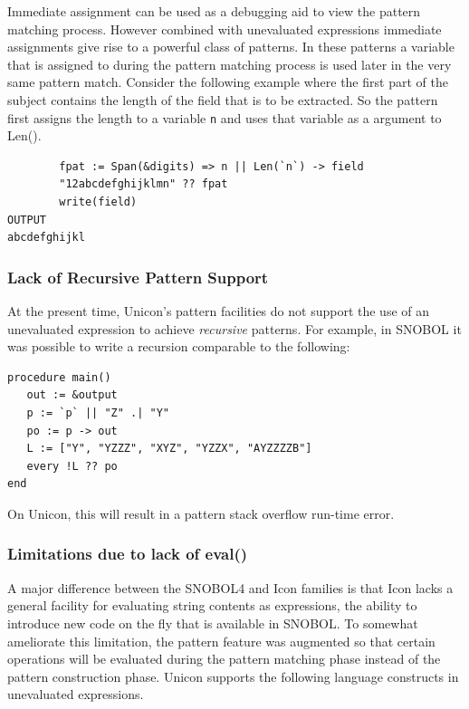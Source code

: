 \documentclass[letterpaper,12pt]{article}
\begin{document}
Immediate assignment can be used as a debugging aid to view the
pattern matching process. However combined with unevaluated
expressions immediate assignments give rise to a powerful class of
patterns. In these patterns a variable that is assigned to during the
pattern matching process is used later in the very same pattern match.
Consider the following example where the first part of the subject
contains the length of the field that is to be extracted. So the
pattern first assigns the length to a variable \texttt{n} and uses
that variable as a argument to Len().

\begin{verbatim}
        fpat := Span(&digits) => n || Len(`n`) -> field        
        "12abcdefghijklmn" ?? fpat
        write(field)
OUTPUT
abcdefghijkl
\end{verbatim}

\subsubsection{Lack of Recursive Pattern Support}

At the present time, Unicon's pattern facilities do not support
the use of an unevaluated expression to achieve {\em recursive}
patterns.  For example, in SNOBOL it was possible to write a
recursion comparable to the following:

\begin{verbatim}
procedure main()
   out := &output
   p := `p` || "Z" .| "Y"
   po := p -> out
   L := ["Y", "YZZZ", "XYZ", "YZZX", "AYZZZZB"]
   every !L ?? po
end
\end{verbatim}

\noindent
On Unicon, this will result in a pattern stack overflow run-time error.


\subsubsection{Limitations due to lack of eval()}

A major difference between the SNOBOL4 and Icon families is that Icon
lacks a general facility for evaluating string contents as
expressions, the ability to introduce new code on the fly that is
available in SNOBOL. To somewhat ameliorate
this limitation, the pattern feature was augmented so that certain
operations will be evaluated during the pattern matching phase instead
of the pattern construction phase.  Unicon supports the following
language constructs in unevaluated expressions.
\end{document}
